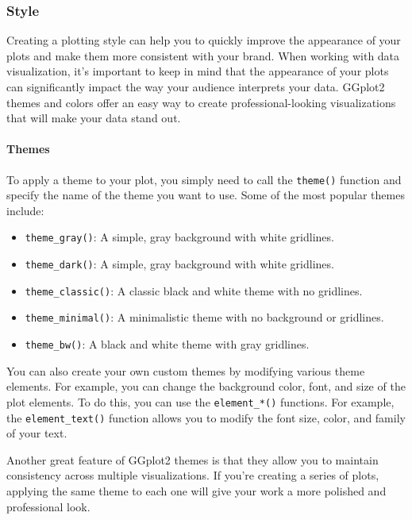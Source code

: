 \documentclass[
]{book}
\providecommand{\tightlist}{%
  \setlength{\itemsep}{0pt}\setlength{\parskip}{0pt}}
\begin{document}
\hypertarget{style}{%
\subsubsection*{Style}\label{style}}

Creating a plotting style can help you to quickly improve the appearance of your plots and make them more consistent with your brand. When working with data visualization, it's important to keep in mind that the appearance of your plots can significantly impact the way your audience interprets your data. GGplot2 themes and colors offer an easy way to create professional-looking visualizations that will make your data stand out.

\hypertarget{themes}{%
\paragraph*{Themes}\label{themes}}

To apply a theme to your plot, you simply need to call the \texttt{theme()} function and specify the name of the theme you want to use. Some of the most popular themes include:

\begin{itemize}
\tightlist
\item
  \texttt{theme\_gray()}: A simple, gray background with white gridlines.
\item
  \texttt{theme\_dark()}: A simple, gray background with white gridlines.
\item
  \texttt{theme\_classic()}: A classic black and white theme with no gridlines.
\item
  \texttt{theme\_minimal()}: A minimalistic theme with no background or gridlines.
\item
  \texttt{theme\_bw()}: A black and white theme with gray gridlines.
\end{itemize}

You can also create your own custom themes by modifying various theme elements. For example, you can change the background color, font, and size of the plot elements. To do this, you can use the \texttt{element\_*()} functions. For example, the \texttt{element\_text()} function allows you to modify the font size, color, and family of your text.

Another great feature of GGplot2 themes is that they allow you to maintain consistency across multiple visualizations. If you're creating a series of plots, applying the same theme to each one will give your work a more polished and professional look.
\end{document}
